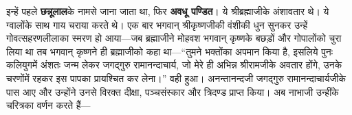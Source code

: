 \begin{sloppypar}\justifying{}
इन्हें पहले \textbf{छन्नूलाल}के नामसे जाना जाता था, फिर \textbf{अवधू पण्डित}। ये श्रीब्रह्माजीके अंशावतार थे। ये ग्वालोंके साथ गाय चराया करते थे। एक बार भगवान् श्रीकृष्णजीकी वंशीकी धुन सुनकर उन्हें गोवत्सहरण\-लीलाका स्मरण हो आया—जब ब्रह्माजीने मोहवश भगवान् कृष्णके बछड़ों और गोपालोंको चुरा लिया था तब भगवान् कृष्णने ही ब्रह्माजीको कहा था—“तुमने भक्तोंका अपमान किया है, इसलिये पुनः कलियुगमें अंशतः जन्म लेकर जगद्गुरु रामानन्दाचार्य, जो मेरे ही अभिन्न श्रीरामजीके अवतार होंगे, उनके चरणोंमें रहकर इस पापका प्रायश्चित कर लेना।” वही हुआ। अनन्तानन्दजी जगद्गुरु रामानन्दाचार्यजीके पास आए और उन्होंने उनसे विरक्त दीक्षा, पञ्चसंस्कार और त्रिदण्ड प्राप्त किया। अब नाभाजी उन्हींके चरित्रका वर्णन करते हैं—
\end{sloppypar}


